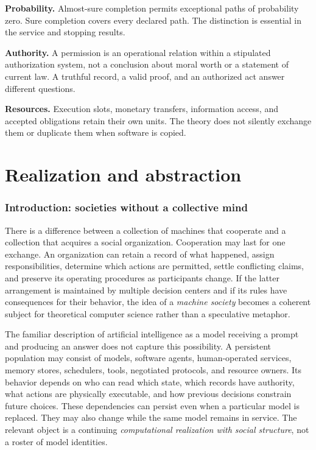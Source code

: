 \documentclass[11pt,letterpaper]{article}
\theoremstyle{plain}
\theoremstyle{definition}
\theoremstyle{remark}
\begin{document}
\noindent\textbf{Probability.} Almost-sure completion permits exceptional paths of probability zero. Sure completion covers every declared path. The distinction is essential in the service and stopping results.

\noindent\textbf{Authority.} A permission is an operational relation within a stipulated authorization system, not a conclusion about moral worth or a statement of current law. A truthful record, a valid proof, and an authorized act answer different questions.

\noindent\textbf{Resources.} Execution slots, monetary transfers, information access, and accepted obligations retain their own units. The theory does not silently exchange them or duplicate them when software is copied.
\clearpage

\part{Realization and abstraction}
\section{Introduction: societies without a collective mind}\label{sec:introduction}

There is a difference between a collection of machines that cooperate and a collection that acquires a social organization. Cooperation may last for one exchange. An organization can retain a record of what happened, assign responsibilities, determine which actions are permitted, settle conflicting claims, and preserve its operating procedures as participants change. If the latter arrangement is maintained by multiple decision centers and if its rules have consequences for their behavior, the idea of a \emph{machine society} becomes a coherent subject for theoretical computer science rather than a speculative metaphor.

The familiar description of artificial intelligence as a model receiving a prompt and producing an answer does not capture this possibility. A persistent population may consist of models, software agents, human-operated services, memory stores, schedulers, tools, negotiated protocols, and resource owners. Its behavior depends on who can read which state, which records have authority, what actions are physically executable, and how previous decisions constrain future choices. These dependencies can persist even when a particular model is replaced. They may also change while the same model remains in service. The relevant object is a continuing \emph{computational realization with social structure}, not a roster of model identities.
\end{document}
